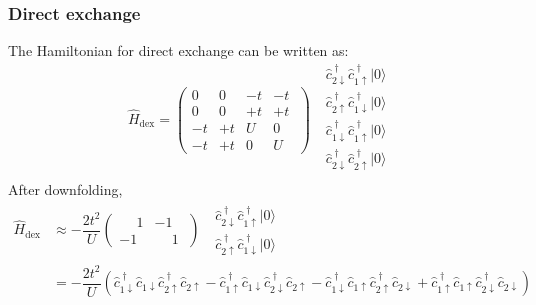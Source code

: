 \documentclass{beamer}
\begin{document}
  \begin{frame}
    \frametitle{Direct exchange}\footnotesize
    The Hamiltonian for direct exchange can be written as:
    \begin{equation*}
      \widehat{H}_{\text{dex}} = \begin{pmatrix}
        0 &  0 & -t & -t \;\\[0.2em]
        0 &  0 & +t & +t \;\\[0.2em]
       -t & +t &  U &  0 \;\\[0.2em]
       -t & +t &  0 &  U \;
      \end{pmatrix}\ \ \ \begin{matrix}
        \widehat{c}_{2\downarrow}^{\;\dagger}\widehat{c}_{1\uparrow}^{\;\dagger}|0\rangle\\
        \widehat{c}_{2\uparrow}^{\;\dagger}\widehat{c}_{1\downarrow}^{\;\dagger}|0\rangle\\
        \widehat{c}_{1\downarrow}^{\;\dagger}\widehat{c}_{1\uparrow}^{\;\dagger}|0\rangle\\
        \widehat{c}_{2\downarrow}^{\;\dagger}\widehat{c}_{2\uparrow}^{\;\dagger}|0\rangle\\
      \end{matrix}
    \end{equation*}
    After downfolding, 
    \begin{equation}
      \begin{aligned}
        \widehat{H}_{\text{dex}} &\approx -\dfrac{2t^2}{U}\begin{pmatrix}
          \phantom{+}1 & -1 \;\\
          -1 & \phantom{+}1 \;
        \end{pmatrix}\ \ \ \begin{matrix}
          \widehat{c}_{2\downarrow}^{\;\dagger}\widehat{c}_{1\uparrow}^{\;\dagger}|0\rangle\\
          \widehat{c}_{2\uparrow}^{\;\dagger}\widehat{c}_{1\downarrow}^{\;\dagger}|0\rangle
        \end{matrix}\\
        &= -\dfrac{2t^2}{U}\left(\widehat{c}_{1\downarrow}^{\;\dagger}\widehat{c}_{1\downarrow}\widehat{c}_{2\uparrow}^{\;\dagger}\widehat{c}_{2\uparrow} - \widehat{c}_{1\uparrow}^{\;\dagger}\widehat{c}_{1\downarrow}\widehat{c}_{2\downarrow}^{\;\dagger}\widehat{c}_{2\uparrow} - \widehat{c}_{1\downarrow}^{\;\dagger}\widehat{c}_{1\uparrow}\widehat{c}_{2\uparrow}^{\;\dagger}\widehat{c}_{2\downarrow}+\widehat{c}_{1\uparrow}^{\;\dagger}\widehat{c}_{1\uparrow}\widehat{c}_{2\downarrow}^{\;\dagger}\widehat{c}_{2\downarrow}\right)\\

\end{aligned}
\end{equation}
\end{frame}
\end{document}
